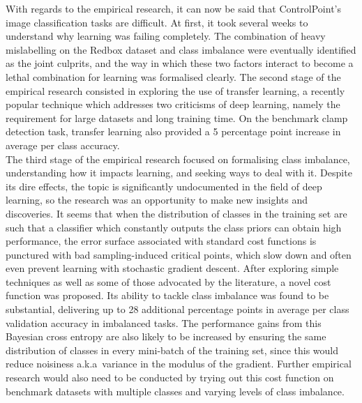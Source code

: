 \documentclass[a4paper,11pt]{article}
\begin{document}
With regards to the empirical research, it can now be said that ControlPoint's image classification tasks are difficult. At first, it took several weeks to understand why learning was failing completely. The combination of heavy mislabelling on the Redbox dataset and class imbalance were eventually identified as the joint culprits, and the way in which these two factors interact to become a lethal combination for learning was formalised clearly. The second stage of the empirical research consisted in exploring the use of transfer learning, a recently popular technique which addresses two criticisms of deep learning, namely the requirement for large datasets and long training time. On the benchmark clamp detection task, transfer learning also provided a 5 percentage point increase in average per class accuracy. \\

The third stage of the  empirical research focused on formalising class imbalance, understanding how it impacts learning, and seeking ways to deal with it. Despite its dire effects, the topic is significantly undocumented in the field of deep learning, so the research was an opportunity to make new insights and discoveries. It seems that when the distribution of classes in the training set are such that a classifier which constantly outputs the class priors can obtain high performance, the error surface associated with standard cost functions is punctured with bad sampling-induced critical points, which slow down and often even prevent learning with stochastic gradient descent.  After exploring simple techniques as well as some of those advocated by the literature, a novel cost function was proposed. Its ability to tackle class imbalance was found to be substantial, delivering up to 28 additional percentage points in average per class validation accuracy in imbalanced tasks. The performance gains from this Bayesian cross entropy are also likely to be increased by ensuring the same distribution of classes in every mini-batch of the training set, since this would reduce noisiness a.k.a\ variance in the modulus of the gradient. Further empirical research would also need to be conducted by trying out this cost function on benchmark datasets with multiple classes and varying levels of class imbalance. \\

\end{document}
